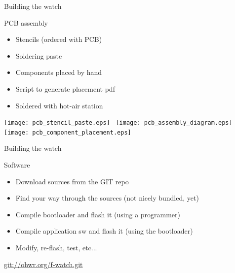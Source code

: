 \documentclass[compress,red]{beamer}
\begin{document}
\begin{frame}{Building the watch}

  PCB assembly

  \begin{itemize}
  \item Stencils (ordered with PCB)
  \item Soldering paste
  \item Components placed by hand
  \item Script to generate placement pdf
  \item Soldered with hot-air station
  \end{itemize}

  \begin{center}
    \texttt{[image: pcb\_stencil\_paste.eps]}~
    \texttt{[image: pcb\_assembly\_diagram.eps]}~
    \texttt{[image: pcb\_component\_placement.eps]}
  \end{center}


\end{frame}

\begin{frame}{Building the watch}

  Software

  \begin{itemize}
  \item Download sources from the GIT repo
  \item Find your way through the sources (not nicely bundled, yet)
  \item Compile bootloader and flash it (using a programmer)
  \item Compile application sw and flash it (using the bootloader)
  \item Modify, re-flash, test, etc...
  \end{itemize}

  \vskip 8mm

  \begin{center}
    \url{git://ohwr.org/f-watch.git}
  \end{center}

  \note[item]{}

\end{frame}
\end{document}
